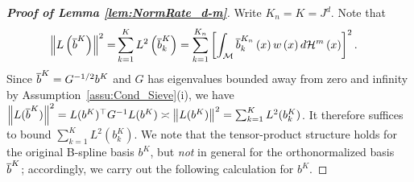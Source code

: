 \documentclass[12pt,american]{article}
\theoremstyle{definition}
\theoremstyle{plain}
\theoremstyle{definition}
\theoremstyle{plain}
\theoremstyle{plain}
\theoremstyle{plain}
\theoremstyle{plain}
\theoremstyle{plain}
\newcommand{\norm}[1]{\left\| #1 \right\|}
\begin{document}
\begin{proof}[\textbf{Proof of Lemma \ref{lem:NormRate_d-m}}]
Write $K_n=K=J^{d}$. Note that
\begin{align*}
\norm{L\left(\ol b^{K}\right)}^{2}= & \sum_{k=1}^{K}L^{2}\left(\ol b_{k}^{K}\right)=\sum_{k=1}^{K_{n}}\left[\int_{{\cal M}}\ol b_{k}^{K_{n}}\left(x\right)w\left(x\right)d{\cal H}^{m}\left(x\right)\right]^{2}.
\end{align*}
Since $\overline{b}^K = G^{-1/2} b^K$ and $G$ has eigenvalues bounded away from zero and infinity
by Assumption~\ref{assu:Cond_Sieve}(i), we have
$\norm{L(\ol b^K)}^2 = L(b^K)^\top G^{-1} L(b^K) \asymp \norm{L(b^K)}^2 = \sum_{k=1}^K L^2(b_k^K)$.
It therefore suffices to bound $\sum_{k=1}^K L^2(b_k^K)$.
We note that the tensor-product structure holds for the original B-spline basis $b^K$, but \emph{not}
in general for the orthonormalized basis $\overline{b}^K$; accordingly, we carry out the following calculation for $b^K$.


\end{proof}
\end{document}
